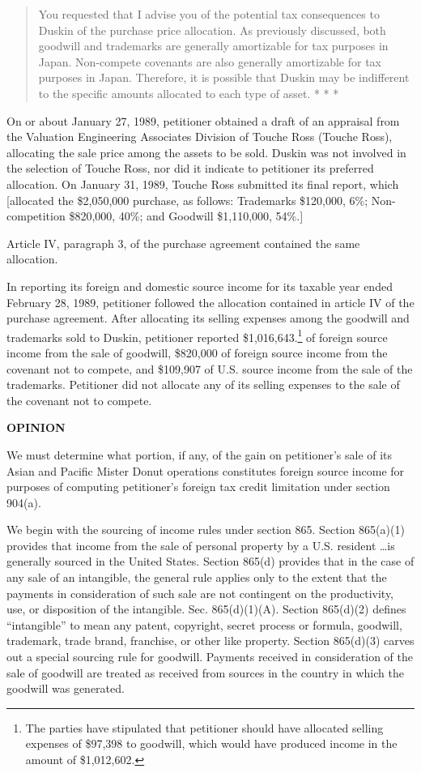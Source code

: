 \begin{select}
\begin{quote}
You requested that I advise you of the potential tax consequences to Duskin of the purchase price
allocation. As previously discussed, both goodwill and trademarks are generally amortizable for tax purposes
in Japan. Non-compete covenants are also generally amortizable for tax purposes in Japan. Therefore, it is
possible that Duskin may be indifferent to the specific amounts allocated to each type of asset. * * *
\end{quote}
On or about January 27, 1989, petitioner obtained a draft of an appraisal from the Valuation Engineering Associates
Division of Touche Ross (Touche Ross), allocating the sale price among the assets to be sold. Duskin was not involved in
the selection of Touche Ross, nor did it indicate to petitioner its preferred allocation.
On January 31, 1989, Touche Ross submitted its final report, which [allocated the \$2,050,000 purchase, as
follows: Trademarks \$120,000, 6\%; Non-competition \$820,000, 40\%; and Goodwill \$1,110,000, 54\%.]

Article IV, paragraph 3, of the purchase agreement contained the same allocation.

In reporting its foreign and domestic source income for its taxable year ended February 28, 1989, petitioner followed
the allocation contained in article IV of the purchase agreement. After allocating its selling expenses among the goodwill
and trademarks sold to Duskin, petitioner reported \$1,016,643.\footnote[13] {The parties have stipulated that petitioner should have allocated selling expenses of \$97,398 to goodwill, which would have produced income in the amount of \$1,012,602.} of foreign source income from the sale of
goodwill, \$820,000 of foreign source income from the covenant not to compete, and \$109,907 of U.S. source
income from the sale of the trademarks. Petitioner did not allocate any of its selling expenses to the sale of the covenant not to compete. 

\begin{center} \textbf{OPINION}
\end{center}
We must determine what portion, if any, of the gain on petitioner's sale of its Asian and Pacific Mister Donut operations
constitutes foreign source income for purposes of computing petitioner's foreign tax credit limitation under section 904(a).

We begin with the sourcing of income rules under section 865. Section 865(a)(1) provides that income from the
sale of personal property by a U.S. resident \ldots is generally sourced in the United States. Section 865(d) provides that
in the case of any sale of an intangible, the general rule applies only to the extent that the payments in consideration of such sale are not contingent on the productivity, use, or disposition of the intangible. Sec. 865(d)(1)(A). Section
865(d)(2) defines ``intangible'' to mean any patent, copyright, secret process or formula, goodwill, trademark, trade brand,
franchise, or other like property. Section 865(d)(3) carves out a special sourcing rule for goodwill. Payments received
in consideration of the sale of goodwill are treated as received from sources in the country in which the goodwill was
generated.


\end{select}
